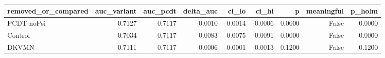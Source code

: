 \begin{tabular}{lrrrrrrrr}
\toprule
removed\_or\_compared & auc\_variant & auc\_pcdt & delta\_auc & ci\_lo & ci\_hi & p & meaningful & p\_holm \\
\midrule
PCDT-noPsi & 0.7127 & 0.7117 & -0.0010 & -0.0014 & -0.0006 & 0.0000 & False & 0.0000 \\
Control & 0.7034 & 0.7117 & 0.0083 & 0.0075 & 0.0091 & 0.0000 & False & 0.0000 \\
DKVMN & 0.7111 & 0.7117 & 0.0006 & -0.0001 & 0.0013 & 0.1200 & False & 0.1200 \\
\bottomrule
\end{tabular}
